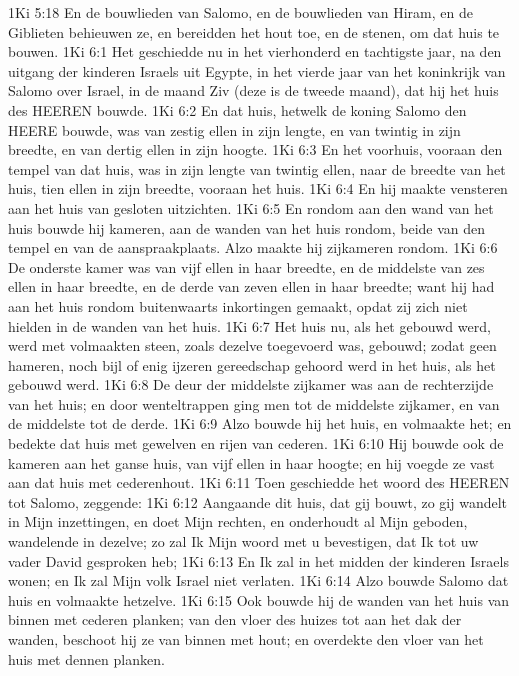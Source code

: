 1Ki 5:18  En de bouwlieden van Salomo, en de bouwlieden van Hiram, en de Giblieten behieuwen ze, en bereidden het hout toe, en de stenen, om dat huis te bouwen.
1Ki 6:1  Het geschiedde nu in het vierhonderd en tachtigste jaar, na den uitgang der kinderen Israels uit Egypte, in het vierde jaar van het koninkrijk van Salomo over Israel, in de maand Ziv (deze is de tweede maand), dat hij het huis des HEEREN bouwde.
1Ki 6:2  En dat huis, hetwelk de koning Salomo den HEERE bouwde, was van zestig ellen in zijn lengte, en van twintig in zijn breedte, en van dertig ellen in zijn hoogte.
1Ki 6:3  En het voorhuis, vooraan den tempel van dat huis, was in zijn lengte van twintig ellen, naar de breedte van het huis, tien ellen in zijn breedte, vooraan het huis.
1Ki 6:4  En hij maakte vensteren aan het huis van gesloten uitzichten.
1Ki 6:5  En rondom aan den wand van het huis bouwde hij kameren, aan de wanden van het huis rondom, beide van den tempel en van de aanspraakplaats. Alzo maakte hij zijkameren rondom.
1Ki 6:6  De onderste kamer was van vijf ellen in haar breedte, en de middelste van zes ellen in haar breedte, en de derde van zeven ellen in haar breedte; want hij had aan het huis rondom buitenwaarts inkortingen gemaakt, opdat zij zich niet hielden in de wanden van het huis.
1Ki 6:7  Het huis nu, als het gebouwd werd, werd met volmaakten steen, zoals dezelve toegevoerd was, gebouwd; zodat geen hameren, noch bijl of enig ijzeren gereedschap gehoord werd in het huis, als het gebouwd werd.
1Ki 6:8  De deur der middelste zijkamer was aan de rechterzijde van het huis; en door wenteltrappen ging men tot de middelste zijkamer, en van de middelste tot de derde.
1Ki 6:9  Alzo bouwde hij het huis, en volmaakte het; en bedekte dat huis met gewelven en rijen van cederen.
1Ki 6:10  Hij bouwde ook de kameren aan het ganse huis, van vijf ellen in haar hoogte; en hij voegde ze vast aan dat huis met cederenhout.
1Ki 6:11  Toen geschiedde het woord des HEEREN tot Salomo, zeggende:
1Ki 6:12  Aangaande dit huis, dat gij bouwt, zo gij wandelt in Mijn inzettingen, en doet Mijn rechten, en onderhoudt al Mijn geboden, wandelende in dezelve; zo zal Ik Mijn woord met u bevestigen, dat Ik tot uw vader David gesproken heb;
1Ki 6:13  En Ik zal in het midden der kinderen Israels wonen; en Ik zal Mijn volk Israel niet verlaten.
1Ki 6:14  Alzo bouwde Salomo dat huis en volmaakte hetzelve.
1Ki 6:15  Ook bouwde hij de wanden van het huis van binnen met cederen planken; van den vloer des huizes tot aan het dak der wanden, beschoot hij ze van binnen met hout; en overdekte den vloer van het huis met dennen planken.
